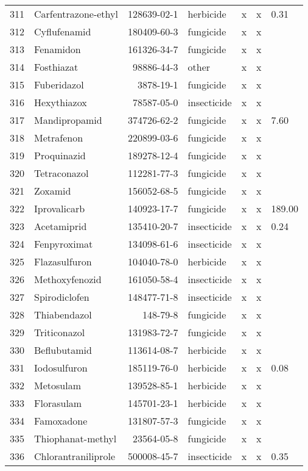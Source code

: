 \begin{longtable}{lp{3cm}rlp{0.5cm}p{0.5cm}p{1cm}}
  311 & Carfentrazone-ethyl & 128639-02-1 & herbicide & x & x & 0.31 \\ 
  312 & Cyflufenamid & 180409-60-3 & fungicide & x & x &  \\ 
  313 & Fenamidon & 161326-34-7 & fungicide & x & x &  \\ 
  314 & Fosthiazat & 98886-44-3 & other & x & x &  \\ 
  315 & Fuberidazol & 3878-19-1 & fungicide & x & x &  \\ 
  316 & Hexythiazox & 78587-05-0 & insecticide & x & x &  \\ 
  317 & Mandipropamid & 374726-62-2 & fungicide & x & x & 7.60 \\ 
  318 & Metrafenon & 220899-03-6 & fungicide & x & x &  \\ 
  319 & Proquinazid & 189278-12-4 & fungicide & x & x &  \\ 
  320 & Tetraconazol & 112281-77-3 & fungicide & x & x &  \\ 
  321 & Zoxamid & 156052-68-5 & fungicide & x & x &  \\ 
  322 & Iprovalicarb & 140923-17-7 & fungicide & x & x & 189.00 \\ 
  323 & Acetamiprid & 135410-20-7 & insecticide & x & x & 0.24 \\ 
  324 & Fenpyroximat & 134098-61-6 & insecticide & x & x &  \\ 
  325 & Flazasulfuron & 104040-78-0 & herbicide & x & x &  \\ 
  326 & Methoxyfenozid & 161050-58-4 & insecticide & x & x &  \\ 
  327 & Spirodiclofen & 148477-71-8 & insecticide & x & x &  \\ 
  328 & Thiabendazol & 148-79-8 & fungicide & x & x &  \\ 
  329 & Triticonazol & 131983-72-7 & fungicide & x & x &  \\ 
  330 & Beflubutamid & 113614-08-7 & herbicide & x & x &  \\ 
  331 & Iodosulfuron & 185119-76-0 & herbicide & x & x & 0.08 \\ 
  332 & Metosulam & 139528-85-1 & herbicide & x & x &  \\ 
  333 & Florasulam & 145701-23-1 & herbicide & x & x &  \\ 
  334 & Famoxadone & 131807-57-3 & fungicide & x & x &  \\ 
  335 & Thiophanat-methyl & 23564-05-8 & fungicide & x & x &  \\ 
  336 & Chlorantraniliprole & 500008-45-7 & insecticide & x & x & 0.35 \\ 

\end{longtable}
